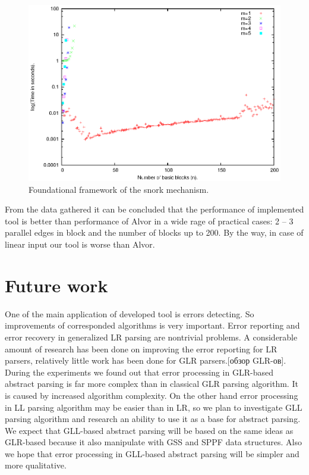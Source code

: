 \documentclass{sigplanconf}
\begin{document}
\begin{figure}
    \begin{center}
        \includegraphics[scale=0.65]{Graphics/alvor.eps}
    \end{center}
    \caption{Foundational framework of the snork mechanism.}
    \label{fig-ffsm}
\end{figure}


From the data gathered it can be concluded that the performance of implemented tool is better than performance of Alvor in a wide rage of practical cases: 2 -- 3 parallel edges in block and the number of blocks up to 200. By the way, in case of linear input our tool is worse than Alvor.

\section{Future work}
One of the main application of developed tool is errors detecting. So improvements of corresponded algorithms is very important. Error reporting and error recovery in generalized LR parsing are nontrivial problems. A considerable amount of research has been done on improving the error reporting for LR parsers, relatively little work has been done for GLR parsers.[обзор GLR-ов]. During the experiments we found out that error processing in GLR-based abstract parsing is far more complex than in classical  GLR parsing algorithm. It is caused by increased algorithm complexity. On the other hand error processing in LL parsing algorithm may be easier than in LR, so we plan to investigate GLL parsing algorithm and research an ability to use it as a base for abstract parsing. We expect that GLL-based abstract parsing will be based on the same ideas as GLR-based because it also manipulate with GSS and SPPF data structures. Also we hope that error processing in GLL-based abstract parsing will be simpler and more qualitative.
\end{document}
